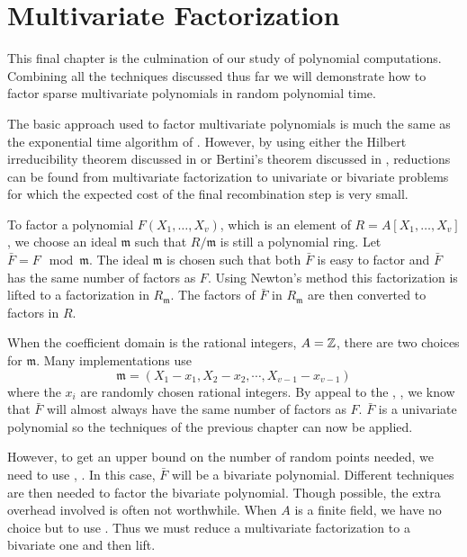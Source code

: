 \chapter{Multivariate Factorization}
\label{Factoring:Chap}

This final chapter is the culmination of our study of polynomial
computations.  Combining all the techniques discussed thus far we will
demonstrate how to factor sparse multivariate polynomials in random
polynomial time.  

The basic approach used to factor multivariate polynomials is much
the same as the exponential time algorithm of .
However, by using either the Hilbert irreducibility theorem
discussed in  or Bertini's theorem discussed in
, reductions can be found from
multivariate factorization to univariate or bivariate problems for
which the expected cost of the final recombination step is very small.

To factor a polynomial $F(X_1, \ldots, X_v)$, which is an element of
$R = A[X_1, \ldots, X_v]$, we choose an ideal $\mathfrak{m}$ such that
$R/\mathfrak{m}$ is still a polynomial ring.  Let $\bar{F} = F \mod\mathfrak{m}$.  The ideal $\mathfrak{m}$ is chosen such that both $\bar{F}$ is
easy to factor and $\bar{F}$ has the same number of factors as $F$.
Using Newton's method this factorization is lifted to a factorization
in $R_\mathfrak{m}$.  The factors of $\bar{F}$ in $R_\mathfrak{m}$ are then
converted to factors in $R$.

When the coefficient domain is the rational integers, $A = \mathbb{Z}$, 
there are two choices for $\mathfrak{m}$.  Many implementations use
\[
\mathfrak{m} = (X_1 - x_1, X_2 - x_2, \cdots, X_{v-1} -x_{v-1})
\]
where the $x_i$ are randomly chosen rational integers.  By appeal to
the , , we
know that $\bar{F}$ will almost always have the same number of factors
as $F$.  $\bar{F}$ is a univariate polynomial so the techniques of the
previous chapter can now be applied.

However, to get an upper bound on the number of random points needed,
we need to use , .  In
this case, $\bar{F}$ will be a bivariate polynomial.  Different
techniques are then needed to factor the bivariate polynomial.  Though
possible, the extra overhead involved is often not worthwhile.
When $A$ is a finite field, we have no choice but to use
.  Thus we must reduce a multivariate
factorization to a bivariate one and then lift. 

